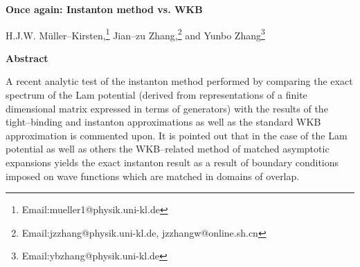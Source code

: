 \documentclass[a4paper,12pt,a4]{article}
\begin{document}
\setlength{\textheight}{7.4in}
\setlength{\topmargin}{-0.6in}
\setlength{\oddsidemargin}{0.2in}
\setlength{\evensidemargin}{0.5in}
\renewcommand{\thefootnote}{\fnsymbol{footnote}}

\begin{center}
{\Large {\bf Once again: Instanton method vs. WKB}}

\vspace{0.8cm}

{H.J.W. M\"uller--Kirsten,\raisebox{0.8ex}{\small a}\footnote[1]
{ Email:mueller1@physik.uni-kl.de}
Jian--zu Zhang,\raisebox{0.8ex}{\small a,b}\footnote[2]
{Email:jzzhang@physik.uni-kl.de, jzzhangw@online.sh.cn}
and Yunbo Zhang\raisebox{0.8 ex}{\small a,c}\footnote[3]
{Email:ybzhang@physik.uni-kl.de}}




\end{center}

\vspace{0.3cm}

{\centerline{\bf Abstract}}
\noindent
A recent analytic test of the instanton method
performed by comparing the exact spectrum of the
Lam\coordHE{} potential (derived from representations of a
finite dimensional matrix expressed in terms of \coordHE{}
generators) with the results of the tight--binding and  instanton
approximations as well as the standard WKB approximation
is commented upon. It is pointed out  that in the case
of the Lam\coordHE{} potential as well as
others the WKB--related method of matched
asymptotic expansions yields the exact instanton
result as a result of boundary
conditions imposed on wave functions which are matched in 
domains of overlap.

\vspace{2cm}
\end{document}
